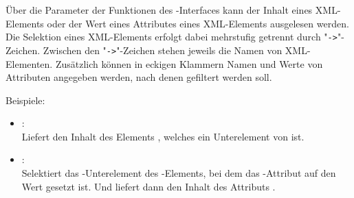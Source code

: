 Über die Parameter der Funktionen des -Interfaces kann der Inhalt eines XML-Elements oder der Wert eines
Attributes eines XML-Elements ausgelesen werden. Die Selektion eines XML-Elements erfolgt dabei mehrstufig
getrennt durch "\texttt{->}"-Zeichen. Zwischen den "\texttt{->}"-Zeichen stehen jeweils die Namen von XML-Elementen.
Zusätzlich können in eckigen Klammern Namen und Werte von Attributen angegeben werden, nach denen gefiltert werden soll.

Beispiele:

\begin{itemize}

\item
{}:\\
Liefert den Inhalt des Elements , welches ein Unterelement von  ist.	

\item
{}:\\
Selektiert das -Unterelement des -Elements, bei
dem das -Attribut auf den Wert  gesetzt ist. Und liefert dann den Inhalt des Attributs
.

\end{itemize}